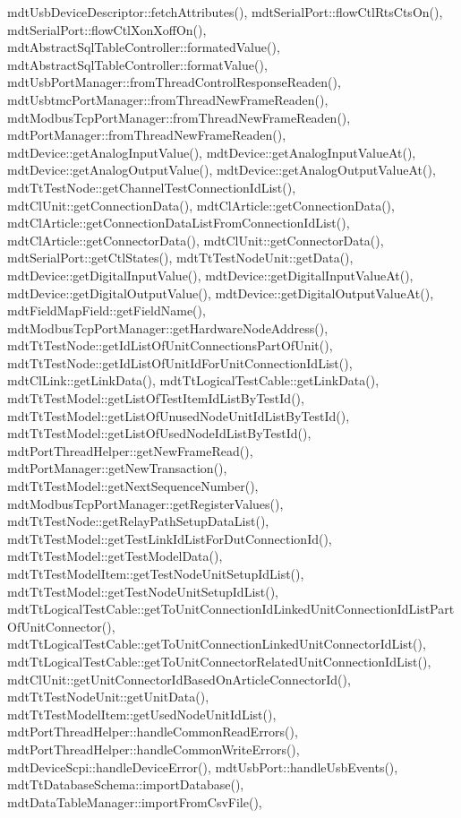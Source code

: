 mdt\-Usb\-Device\-Descriptor\-::fetch\-Attributes(), mdt\-Serial\-Port\-::flow\-Ctl\-Rts\-Cts\-On(), mdt\-Serial\-Port\-::flow\-Ctl\-Xon\-Xoff\-On(), mdt\-Abstract\-Sql\-Table\-Controller\-::formated\-Value(), mdt\-Abstract\-Sql\-Table\-Controller\-::format\-Value(), mdt\-Usb\-Port\-Manager\-::from\-Thread\-Control\-Response\-Readen(), mdt\-Usbtmc\-Port\-Manager\-::from\-Thread\-New\-Frame\-Readen(), mdt\-Modbus\-Tcp\-Port\-Manager\-::from\-Thread\-New\-Frame\-Readen(), mdt\-Port\-Manager\-::from\-Thread\-New\-Frame\-Readen(), mdt\-Device\-::get\-Analog\-Input\-Value(), mdt\-Device\-::get\-Analog\-Input\-Value\-At(), mdt\-Device\-::get\-Analog\-Output\-Value(), mdt\-Device\-::get\-Analog\-Output\-Value\-At(), mdt\-Tt\-Test\-Node\-::get\-Channel\-Test\-Connection\-Id\-List(), mdt\-Cl\-Unit\-::get\-Connection\-Data(), mdt\-Cl\-Article\-::get\-Connection\-Data(), mdt\-Cl\-Article\-::get\-Connection\-Data\-List\-From\-Connection\-Id\-List(), mdt\-Cl\-Article\-::get\-Connector\-Data(), mdt\-Cl\-Unit\-::get\-Connector\-Data(), mdt\-Serial\-Port\-::get\-Ctl\-States(), mdt\-Tt\-Test\-Node\-Unit\-::get\-Data(), mdt\-Device\-::get\-Digital\-Input\-Value(), mdt\-Device\-::get\-Digital\-Input\-Value\-At(), mdt\-Device\-::get\-Digital\-Output\-Value(), mdt\-Device\-::get\-Digital\-Output\-Value\-At(), mdt\-Field\-Map\-Field\-::get\-Field\-Name(), mdt\-Modbus\-Tcp\-Port\-Manager\-::get\-Hardware\-Node\-Address(), mdt\-Tt\-Test\-Node\-::get\-Id\-List\-Of\-Unit\-Connections\-Part\-Of\-Unit(), mdt\-Tt\-Test\-Node\-::get\-Id\-List\-Of\-Unit\-Id\-For\-Unit\-Connection\-Id\-List(), mdt\-Cl\-Link\-::get\-Link\-Data(), mdt\-Tt\-Logical\-Test\-Cable\-::get\-Link\-Data(), mdt\-Tt\-Test\-Model\-::get\-List\-Of\-Test\-Item\-Id\-List\-By\-Test\-Id(), mdt\-Tt\-Test\-Model\-::get\-List\-Of\-Unused\-Node\-Unit\-Id\-List\-By\-Test\-Id(), mdt\-Tt\-Test\-Model\-::get\-List\-Of\-Used\-Node\-Id\-List\-By\-Test\-Id(), mdt\-Port\-Thread\-Helper\-::get\-New\-Frame\-Read(), mdt\-Port\-Manager\-::get\-New\-Transaction(), mdt\-Tt\-Test\-Model\-::get\-Next\-Sequence\-Number(), mdt\-Modbus\-Tcp\-Port\-Manager\-::get\-Register\-Values(), mdt\-Tt\-Test\-Node\-::get\-Relay\-Path\-Setup\-Data\-List(), mdt\-Tt\-Test\-Model\-::get\-Test\-Link\-Id\-List\-For\-Dut\-Connection\-Id(), mdt\-Tt\-Test\-Model\-::get\-Test\-Model\-Data(), mdt\-Tt\-Test\-Model\-Item\-::get\-Test\-Node\-Unit\-Setup\-Id\-List(), mdt\-Tt\-Test\-Model\-::get\-Test\-Node\-Unit\-Setup\-Id\-List(), mdt\-Tt\-Logical\-Test\-Cable\-::get\-To\-Unit\-Connection\-Id\-Linked\-Unit\-Connection\-Id\-List\-Part\-Of\-Unit\-Connector(), mdt\-Tt\-Logical\-Test\-Cable\-::get\-To\-Unit\-Connection\-Linked\-Unit\-Connector\-Id\-List(), mdt\-Tt\-Logical\-Test\-Cable\-::get\-To\-Unit\-Connector\-Related\-Unit\-Connection\-Id\-List(), mdt\-Cl\-Unit\-::get\-Unit\-Connector\-Id\-Based\-On\-Article\-Connector\-Id(), mdt\-Tt\-Test\-Node\-Unit\-::get\-Unit\-Data(), mdt\-Tt\-Test\-Model\-Item\-::get\-Used\-Node\-Unit\-Id\-List(), mdt\-Port\-Thread\-Helper\-::handle\-Common\-Read\-Errors(), mdt\-Port\-Thread\-Helper\-::handle\-Common\-Write\-Errors(), mdt\-Device\-Scpi\-::handle\-Device\-Error(), mdt\-Usb\-Port\-::handle\-Usb\-Events(), mdt\-Tt\-Database\-Schema\-::import\-Database(), mdt\-Data\-Table\-Manager\-::import\-From\-Csv\-File(), 